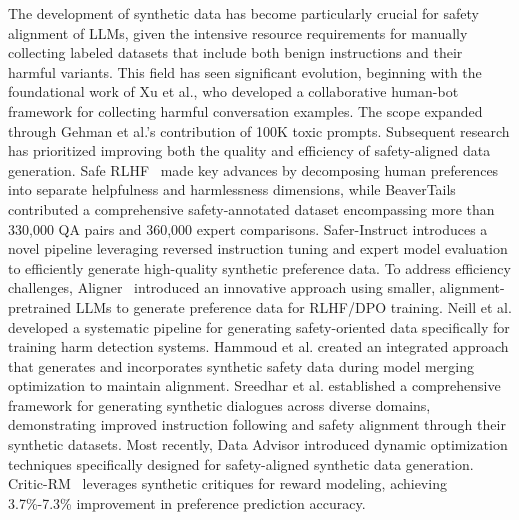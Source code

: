 The development of synthetic data has become particularly crucial for safety alignment of LLMs, given the intensive resource requirements for manually collecting labeled datasets that include both benign instructions and their harmful variants. This field has seen significant evolution, beginning with the foundational work of Xu et al.\cite{xu2021bot}, who developed a collaborative human-bot framework for collecting harmful conversation examples. The scope expanded through Gehman et al.'s\cite{gehman2020realtoxicityprompts} contribution of 100K toxic prompts. Subsequent research has prioritized improving both the quality and efficiency of safety-aligned data generation. Safe RLHF~\cite{safe-rlhf} made key advances by decomposing human preferences into separate helpfulness and harmlessness dimensions, while BeaverTails~\cite{beavertails} contributed a comprehensive safety-annotated dataset encompassing more than 330,000 QA pairs and 360,000 expert comparisons. Safer-Instruct \cite{shi-etal-2024-safer} introduces a novel pipeline leveraging reversed instruction tuning and expert model evaluation to efficiently generate high-quality synthetic preference data. To address efficiency challenges, Aligner~\cite{ji2024aligner} introduced an innovative approach using smaller, alignment-pretrained LLMs to generate preference data for RLHF/DPO training. Neill et al.\cite{o2024guardformer} developed a systematic pipeline for generating safety-oriented data specifically for training harm detection systems. Hammoud et al.\cite{hammoud2024model} created an integrated approach that generates and incorporates synthetic safety data during model merging optimization to maintain alignment. Sreedhar et al.\cite{sreedhar2024canttalkaboutthis} established a comprehensive framework for generating synthetic dialogues across diverse domains, demonstrating improved instruction following and safety alignment through their synthetic datasets. Most recently, Data Advisor\cite{wang-etal-2024-data} introduced dynamic optimization techniques specifically designed for safety-aligned synthetic data generation. Critic-RM~\cite{yu2024self} leverages synthetic critiques for reward modeling, achieving 3.7\%-7.3\% improvement in preference prediction accuracy.

